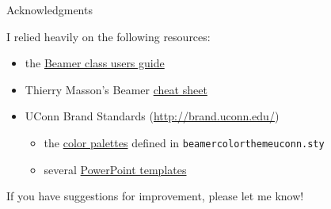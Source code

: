 \documentclass{beamer}
\begin{document}
\begin{frame}{Acknowledgments}
\label{slide:acknowledgments}

I relied heavily on the following resources:
\begin{itemize}
\item the \href{http://texdoc.net/texmf-dist/doc/latex/beamer/doc/beameruserguide.pdf}{Beamer class users guide}
\item Thierry Masson's Beamer \href{http://www.cpt.univ-mrs.fr/~masson/latex/Beamer-appearance-cheat-sheet.pdf}{cheat sheet}
\item UConn Brand Standards (\url{http://brand.uconn.edu/})
\begin{itemize}
\item the \href{http://brand.uconn.edu/standards/color-palette/}{color palettes} defined in {\tt beamercolorthemeuconn.sty}
\item several \href{http://brand.uconn.edu/resources/powerpoint-templates/}{PowerPoint templates}
\end{itemize}
\end{itemize}

\vfill
If you have suggestions for improvement, please let me know!

\center\hyperlink{mailto:brunson@uchc.edu}{}

\end{frame}
\end{document}
